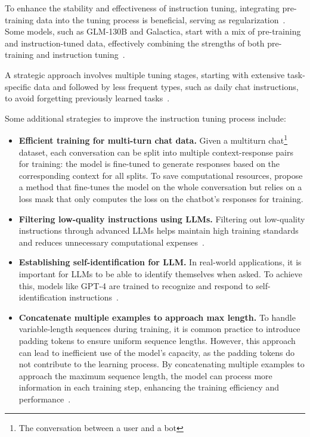 To enhance the stability and effectiveness of instruction tuning, integrating pre-training data into the tuning process is beneficial, serving as regularization~\cite{wei2022fine}.
Some models, such as GLM-130B and Galactica, start with a mix of pre-training and instruction-tuned data, effectively combining the strengths of both pre-training and instruction tuning~\cite{chowdhery2022palm}.

A strategic approach involves multiple tuning stages, starting with extensive task-specific data and followed by less frequent types, such as daily chat instructions, to avoid forgetting previously learned tasks~\cite{raffel2023exploring}.

Some additional strategies to improve the instruction tuning process include:
\begin{itemize}
	\item \textbf{Efficient training for multi-turn chat data.} {Given a multiturn chat\footnote{The conversation between a user and a bot} dataset, each conversation can be split into multiple context-response pairs for training: the model is fine-tuned to generate responses based on the corresponding context for all splits. To save computational resources, \textcite{chiang2023vicuna} propose a method that fine-tunes the model on the whole conversation but relies on a loss mask that only computes the loss on the chatbot's responses for training.
	      }
	\item \textbf{Filtering low-quality instructions using LLMs.} {Filtering out low-quality instructions through advanced LLMs helps maintain high training standards and reduces unnecessary computational expenses~\cite{wei2022fine}.}
	\item \textbf{Establishing self-identification for LLM.} {In real-world applications, it is important for LLMs to be able to identify themselves when asked. To achieve this, models like GPT-4 are trained to recognize and respond to self-identification instructions~\cite{radford2023gpt4}.
	      }
	\item \textbf{Concatenate multiple examples to approach max length.} {
		      To handle variable-length sequences during training, it is common practice to introduce padding tokens to ensure uniform sequence lengths. However, this approach can lead to inefficient use of the model's capacity, as the padding tokens do not contribute to the learning process. By concatenating multiple examples to approach the maximum sequence length, the model can process more information in each training step, enhancing the training efficiency and performance~\cite{krell2021efficient}.
}
\end{itemize}
